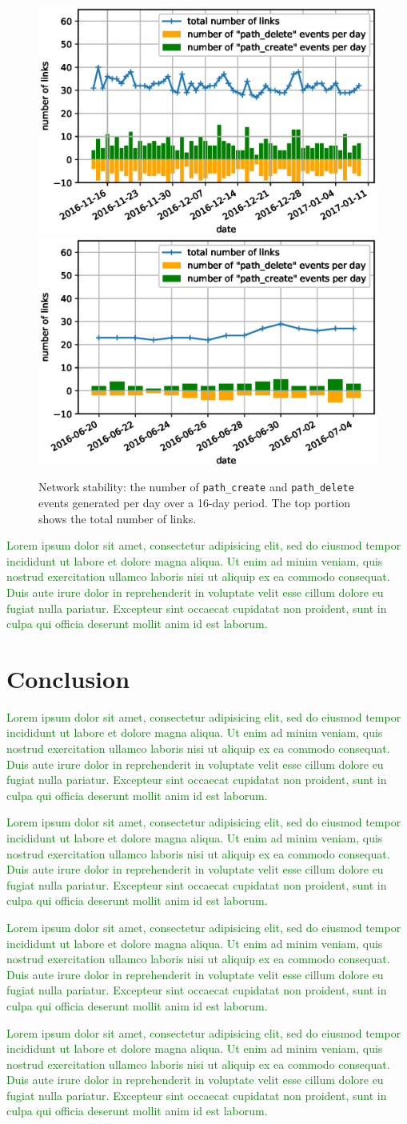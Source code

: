 \documentclass{elsarticle}
\newcommand{\lorem}          {\textcolor{green}{Lorem ipsum dolor sit amet, consectetur adipisicing elit, sed do eiusmod tempor incididunt ut labore et dolore magna aliqua. Ut enim ad minim veniam, quis nostrud exercitation ullamco laboris nisi ut aliquip ex ea commodo consequat. Duis aute irure dolor in reprehenderit in voluptate velit esse cillum dolore eu fugiat nulla pariatur. Excepteur sint occaecat cupidatat non proident, sunt in culpa qui officia deserunt mollit anim id est laborum.}}
\newcommand{\pathcreate}          {{\tt path\_create}\xspace}
\newcommand{\pathdelete}          {{\tt path\_delete}\xspace}
\begin{document}
\begin{figure}
    \includegraphics[width=0.5\columnwidth]{net_churn.eps}
    \includegraphics[width=0.5\columnwidth]{net_churn_peach.eps}
    \caption{
        Network stability: the number of \pathcreate and \pathdelete events generated per day over a 16-day period.
        The top portion shows the total number of links.
    }
    \label{fig:net_churn}
\end{figure}


\lorem

\section{Conclusion}
\label{sec:conclusion}


\lorem


\lorem


\lorem


\lorem

%
%
\end{document}
